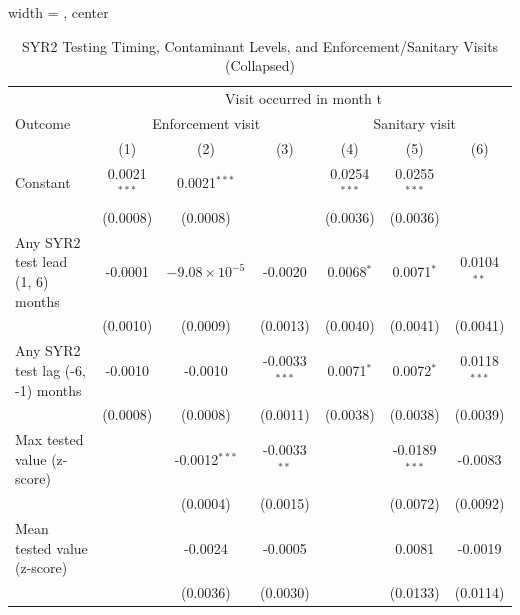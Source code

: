 
\begin{table}[htbp]
   
   \caption{\label{tab:sanitary_visit_syr2_enforcement_zscore_combined} SYR2 Testing Timing, Contaminant Levels, and Enforcement/Sanitary Visits (Collapsed)}
   \bigskip
   
   \centering
   
   \begin{adjustbox}{width = \textwidth, center}
      
      
      \begin{tabular}{lcccccc}
         \toprule
         
          & \multicolumn{6}{c}{Visit occurred in month t}\\
         
         Outcome & \multicolumn{3}{c}{Enforcement visit} & \multicolumn{3}{c}{Sanitary visit} \\ 
         
                                                & (1)            & (2)                    & (3)             & (4)            & (5)             & (6)\\  
         
         \midrule 
         Constant                               & 0.0021$^{***}$ & 0.0021$^{***}$         &                 & 0.0254$^{***}$ & 0.0255$^{***}$  &   \\   
                                                & (0.0008)       & (0.0008)               &                 & (0.0036)       & (0.0036)        &   \\   
         Any SYR2 test lead (1, 6) months       & -0.0001        & $-9.08\times 10^{-5}$  & -0.0020         & 0.0068$^{*}$   & 0.0071$^{*}$    & 0.0104$^{**}$\\   
                                                & (0.0010)       & (0.0009)               & (0.0013)        & (0.0040)       & (0.0041)        & (0.0041)\\   
         Any SYR2 test lag (-6, -1) months      & -0.0010        & -0.0010                & -0.0033$^{***}$ & 0.0071$^{*}$   & 0.0072$^{*}$    & 0.0118$^{***}$\\   
                                                & (0.0008)       & (0.0008)               & (0.0011)        & (0.0038)       & (0.0038)        & (0.0039)\\   
         Max tested value (z-score)             &                & -0.0012$^{***}$        & -0.0033$^{**}$  &                & -0.0189$^{***}$ & -0.0083\\   
                                                &                & (0.0004)               & (0.0015)        &                & (0.0072)        & (0.0092)\\   
         Mean tested value (z-score)            &                & -0.0024                & -0.0005         &                & 0.0081          & -0.0019\\   
                                                &                & (0.0036)               & (0.0030)        &                & (0.0133)        & (0.0114)\\   
         

\end{tabular}
\end{adjustbox}
\end{table}
